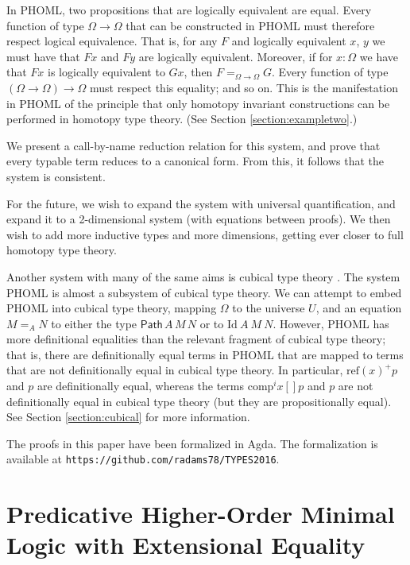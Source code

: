 \documentclass[a4paper,UKenglish]{lipics-v2016}
\newcommand*{\reff}[1]{\ensuremath{\mathrm{ref} \left( {#1} \right)}}
\newcommand{\Path}[3]{\ensuremath{\mathsf{Path} \, {#1} \, {#2} \, {#3}}}
\theoremstyle{plain}
\theoremstyle{definition}
\begin{document}
In PHOML, two propositions that are logically equivalent are equal.  Every function of type $\Omega \rightarrow \Omega$ that can be constructed in PHOML must therefore respect logical equivalence.  That is, for any $F$ and logically equivalent $x$, $y$ we must have that $Fx$ and $Fy$ are logically equivalent. Moreover, if for $x:\Omega$ we have that $Fx$ is logically equivalent to $Gx$, then $F =_{\Omega\to\Omega} G$.
Every function of type $(\Omega \rightarrow \Omega) \rightarrow \Omega$ must respect this equality; and so on.  This is the manifestation in PHOML of the principle that only homotopy invariant constructions can be performed in homotopy type theory.  (See Section \ref{section:exampletwo}.)

We present a call-by-name reduction relation for this system, and prove that every typable term reduces to a canonical form.  From this, it follows that the system is consistent.  

For the future, we wish to expand the system with universal quantification, and expand it to a 2-dimensional system (with equations between proofs).  We then wish to add more inductive types and more dimensions, getting ever closer to full homotopy type theory.

Another system with many of the same aims is cubical type theory \cite{cchm:cubical}.  The system PHOML is almost a subsystem of cubical type theory.  We can attempt to embed PHOML into cubical type theory,
mapping $\Omega$ to the universe $U$, and an equation $M =_A N$ to either the type $\Path{A}{M}{N}$ or to $\mathrm{Id}\ A\ M\ N$.  However, PHOML has more definitional equalities than the relevant fragment of cubical type theory; that is, there are definitionally equal terms in PHOML that are mapped to terms that are not definitionally equal in cubical type theory.  In particular, $\reff{x}^+ p$ and $p$ are definitionally equal, whereas the terms $\mathrm{comp}^i x [] p$ and $p$ are not definitionally equal in cubical type theory (but they are propositionally equal).  See Section \ref{section:cubical} for more information.

The proofs in this paper have been formalized in Agda.  The formalization is available at \texttt{https://github.com/radams78/TYPES2016}.

\section{Predicative Higher-Order Minimal Logic with Extensional Equality}
\end{document}

